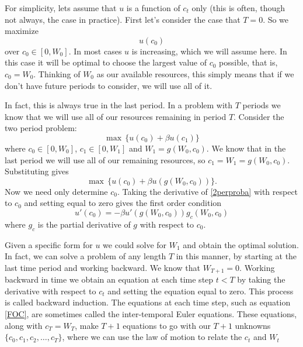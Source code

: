For simplicity, lets assume that $u$ is a function of $c_t$ only (this is often, though not always, the case in practice).
 First let's consider the case that $T=0$.  So we maximize
\begin{equation}\label{1perprob}
u(c_0)
\end{equation}
over $c_0 \in [0,W_0]$.  In most cases $u$ is increasing, which we will assume here.  In this case it will be optimal to choose
 the largest value of $c_0$ possible, that is, $c_0 = W_0$.  Thinking of $W_0$ as our available resources, this simply means
 that if we don't have future periods to consider, we will use all of it.

In fact, this is always true in the last period.  In a problem with $T$ periods we know that we will use all of our resources
remaining in period $T$.  Consider the two period problem:
\begin{equation}
\label{2perprob}
\max \, \{u(c_0) + \beta u(c_1)\}
\end{equation}
where $c_0 \in [0,W_0]$, $c_1 \in [0,W_1]$ and $W_1 = g(W_0,c_0)$.  We know that in the last period we will use all of our
remaining resources, so $c_1 = W_1=g(W_0,c_0)$.  Substituting gives
\begin{equation}
\label{2perproba}
\max \, \{u(c_0) + \beta u(g(W_0,c_0))\}.
\end{equation}
Now we need only determine $c_0$.  Taking the derivative of \eqref{2perproba} with respect to $c_0$ and setting equal to zero
gives the first order condition
\begin{equation}
\label{FOC}
u'(c_0) = -\beta u'(g(W_0,c_0))g_c(W_0,c_0)
\end{equation}
where $g_c$ is the partial derivative of $g$ with respect to $c_0$.

Given a specific form for $u$ we could solve for $W_1$ and obtain the optimal solution.  In fact, we can solve a problem of
any length $T$ in this manner, by starting at the last time period and working backward.  We know that $W_{T+1} = 0$.  Working
backward in time we obtain an equation at each time step $t<T$ by taking the derivative with respect to $c_t$ and setting the equation equal to zero.  This process is called backward induction.  The equations at each time step, such as equation \eqref{FOC}, are sometimes called the inter-temporal Euler equations.  These equations, along with $c_T = W_T$, make $T+1$ equations to go with our $T+1$ unknowns $\{c_0,c_1,c_2,\ldots,c_T\}$, where we can use the law of motion to relate the $c_t$ and $W_t$

